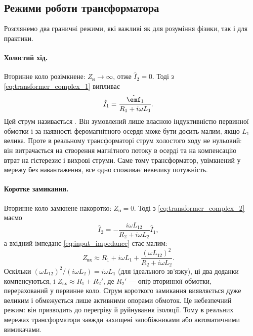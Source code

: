 \subsection*{Режими роботи трансформатора}

Розглянемо два граничні режими, які важливі як для розуміння
фізики, так і для практики.

\paragraph*{Холостий хід.} Вторинне коло розімкнене:
$Z_{\text{н}}\to\infty$, отже $\hat{I}_2=0$. Тоді з
\eqref{eq:transformer_complex_1} випливає
\begin{equation}\label{eq:no_load_current}
	\hat{I}_1 = \frac{\hat{\emf}_1}{R_1 + i\omega L_1}.
\end{equation}
Цей струм називається . Він
зумовлений лише власною індуктивністю первинної обмотки і за
наявності феромагнітного осердя може бути досить малим, якщо
$L_1$ велика. Проте в реальному трансформаторі струм холостого
ходу не нульовий: він витрачається на створення магнітного
потоку в осерді та на компенсацію втрат на гістерезис і вихрові
струми. Саме тому трансформатор, увімкнений у мережу без
навантаження, все одно споживає невелику потужність.

\paragraph*{Коротке замикання.} Вторинне коло замкнене накоротко:
$Z_{\text{н}}=0$. Тоді з \eqref{eq:transformer_complex_2} маємо
\begin{equation}\label{eq:short_circuit_current}
	\hat{I}_2 = -\frac{i\omega L_{12}}{R_2 + i\omega L_2}\hat{I}_1,
\end{equation}
а вхідний імпеданс \eqref{eq:input_impedance} стає малим:
\begin{equation}\label{eq:short_circuit_impedance}
	Z_{\text{вх}} \approx R_1 + i\omega L_1
	+ \frac{(\omega L_{12})^2}{R_2 + i\omega L_2}.
\end{equation}
Оскільки $(\omega L_{12})^2/(i\omega L_2) = i\omega L_1$ (для
ідеального зв'язку), ці два доданки компенсуються, і
$Z_{\text{вх}}\approx R_1 + R_2'$, де $R_2'$ --- опір вторинної
обмотки, перерахований у первинне коло. Струм короткого
замикання виявляється дуже великим і обмежується лише активними
опорами обмоток. Це небезпечний режим: він призводить до
перегріву й руйнування ізоляції. Тому в реальних мережах
трансформатори завжди захищені запобіжниками або автоматичними
вимикачами.

